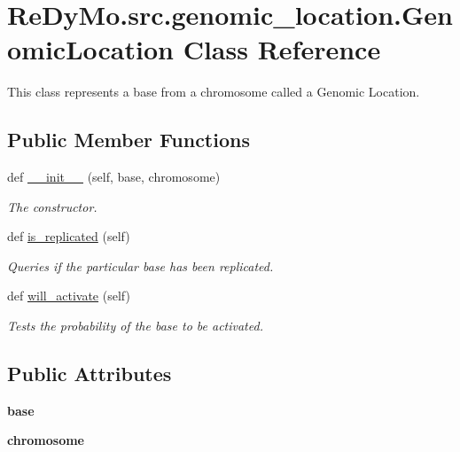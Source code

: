 \hypertarget{classReDyMo_1_1src_1_1genomic__location_1_1GenomicLocation}{}\section{Re\+Dy\+Mo.\+src.\+genomic\+\_\+location.\+Genomic\+Location Class Reference}
\label{classReDyMo_1_1src_1_1genomic__location_1_1GenomicLocation}


This class represents a base from a chromosome called a Genomic Location.  


\subsection*{Public Member Functions}
\begin{DoxyCompactItemize}
\item 
def \mbox{\hyperlink{classReDyMo_1_1src_1_1genomic__location_1_1GenomicLocation_ad2fc819130c39efcd02df0b35e6305b3}{\+\_\+\+\_\+init\+\_\+\+\_\+}} (self, base, chromosome)
\begin{DoxyCompactList}\small\item\em The constructor. \end{DoxyCompactList}\item 
def \mbox{\hyperlink{classReDyMo_1_1src_1_1genomic__location_1_1GenomicLocation_a4f524b6f975b0b22af1b82aad57af0b3}{is\+\_\+replicated}} (self)
\begin{DoxyCompactList}\small\item\em Queries if the particular base has been replicated. \end{DoxyCompactList}\item 
def \mbox{\hyperlink{classReDyMo_1_1src_1_1genomic__location_1_1GenomicLocation_a2cabef230d8c2b1278a92e0e4ff24267}{will\+\_\+activate}} (self)
\begin{DoxyCompactList}\small\item\em Tests the probability of the base to be activated. \end{DoxyCompactList}\end{DoxyCompactItemize}
\subsection*{Public Attributes}
\begin{DoxyCompactItemize}
\item 
\mbox{\label{classReDyMo_1_1src_1_1genomic__location_1_1GenomicLocation_a96ddb3ccb009bf1267042a2a05da16b6}} 
{\bfseries base}
\item 
\mbox{\label{classReDyMo_1_1src_1_1genomic__location_1_1GenomicLocation_abb84c133360e933e46305c2c48aac776}} 
{\bfseries chromosome}
\end{DoxyCompactItemize}


